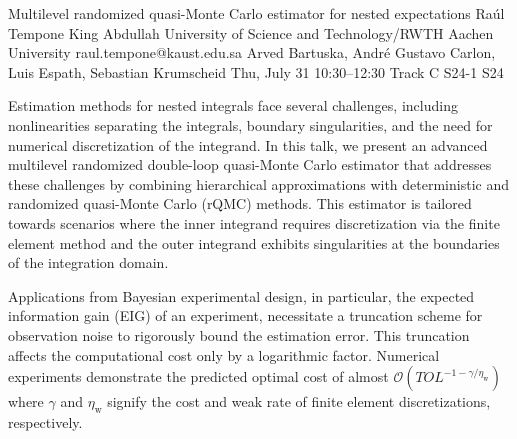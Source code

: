 \begin{talk}
  {Multilevel randomized quasi-Monte Carlo estimator for nested expectations}%
  {Ra\'{u}l Tempone}%
  {King Abdullah University of Science and Technology/RWTH Aachen University}%
  {raul.tempone@kaust.edu.sa}%
  {Arved Bartuska, Andr\'{e} Gustavo Carlon, Luis Espath, Sebastian Krumscheid}%
  {}%
  {Thu, July 31 10:30–12:30 Track C}%
  {S24-1}%
  {S24}%
  
				
			
Estimation methods for nested integrals face several challenges, including nonlinearities separating the integrals, boundary singularities, and the need for numerical discretization of the integrand. In this talk, we present an advanced multilevel randomized double-loop quasi-Monte Carlo estimator that addresses these challenges by combining hierarchical approximations with deterministic and randomized quasi-Monte Carlo (rQMC) methods. This estimator is tailored towards scenarios where the inner integrand requires discretization via the finite element method and the outer integrand exhibits singularities at the boundaries of the integration domain. 

Applications from Bayesian experimental design, in particular, the expected information gain (EIG) of an experiment, necessitate a truncation scheme for observation noise to rigorously bound the estimation error. This truncation affects the computational cost only by a logarithmic factor. Numerical experiments demonstrate the predicted optimal cost of almost $\mathcal{O}(TOL^{-1-\gamma/\eta_{\text{w}}})$ where $\gamma$ and $\eta_{\text{w}}$ signify the cost and weak rate of finite element discretizations, respectively.

\end{talk}

